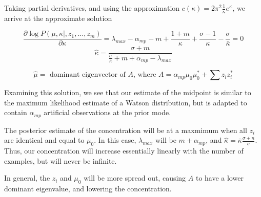 Taking partial derivatives, and using the approximation
$c(\kappa) = 2 \pi^2 \frac{1}{\kappa} e^\kappa$,
we arrive at the approximate solution

$$
\frac{\partial \log P(\mu, \kappa \mid, z_1,\dots,z_m)}
{\partial \kappa} = 
\lambda_{max} - \alpha_{mp} -m + \frac{1+m}{\kappa} + 
\frac{\sigma-1}{\kappa} - \frac{\sigma}{\bar{\kappa}} = 0
$$
$$
\widehat{\kappa} = \frac{\sigma+m}{\frac{\sigma}{\bar{\kappa}}
+ m + \alpha_{mp} - \lambda_{max}}
$$

$$
\widehat{\mu} = \mbox{ dominant eigenvector of }
A\mbox{, where } A = \alpha_{mp} \mu_0 \mu_0^* + \sum z_i z_i^*
$$

Examining this solution, we see that our estimate of the
midpoint is similar to the maximum likelihood estimate of
a Watson distribution, but is adapted to contain
$\alpha_{mp}$ artificial observations at the prior mode.

The posterior estimate of the concentration will be at
a maxmimum when all $z_i$ are identical and equal to 
$\mu_0$. In this case, $\lambda_{max}$ will be
$m + \alpha_{mp}$, and $\widehat{\kappa} = 
\bar{\kappa} \frac{\sigma+n}{\sigma}$. Thus, our concentration will
increase essentially linearly with the number of examples, but will never
be infinite.

In general, the $z_i$ and $\mu_0$ will be more spread out, causing $A$
to have a lower dominant eigenvalue, and lowering the concentration.







